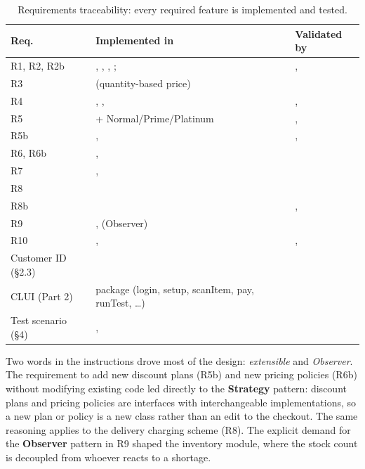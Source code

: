 \begin{table}[H]
\centering
\small
\begin{tabularx}{\linewidth}{p{1.6cm} Y Y}
\toprule
\textbf{Req.} & \textbf{Implemented in} & \textbf{Validated by} \\
\midrule
R1, R2, R2b & , , , ;  & ,  \\
R3 &  (quantity-based price) &  \\
R4 & , ,  & ,  \\
R5 &  + Normal/Prime/Platinum & ,  \\
R5b & ,  & ,  \\
R6, R6b & ,  &  \\
R7 & ,  &  \\
R8 &  &  \\
R8b &  & ,  \\
R9 & ,  (Observer) &  \\
R10 & ,  & ,  \\
Customer ID (\S2.3) &  &  \\
CLUI (Part 2) &  package (login, setup, scanItem, pay, runTest, \ldots) &  \\
Test scenario (\S4) & ,  &  \\
\bottomrule
\end{tabularx}
\caption{Requirements traceability: every required feature is implemented and tested.}
\label{tab:traceability}
\end{table}

Two words in the instructions drove most of the design: \emph{extensible} and
\emph{Observer}. The requirement to add new discount plans (R5b) and new pricing
policies (R6b) without modifying existing code led directly to the
\textbf{Strategy} pattern: discount plans and pricing policies are interfaces
with interchangeable implementations, so a new plan or policy is a new class
rather than an edit to the checkout. The same reasoning applies to the delivery
charging scheme (R8). The explicit demand for the \textbf{Observer} pattern in
R9 shaped the inventory module, where the stock count is decoupled from whoever
reacts to a shortage.

